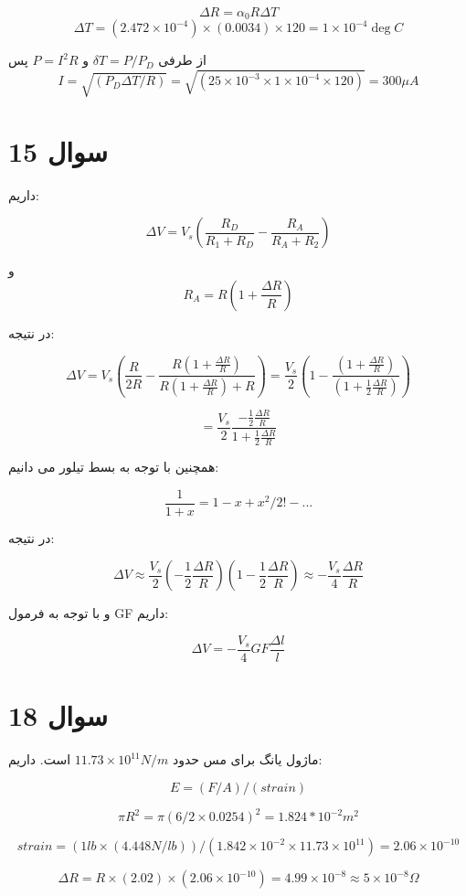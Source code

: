 \documentclass[12pt]{article}
\begin{document}
$$\Delta R = \alpha_0 R \Delta T$$
$$\Delta T = (2.472 \times 10^{-4}) \times (0.0034) \times 120 = 1 \times 10^{-4} \deg C$$

از طرفی 
$\delta T = P/P_D$
و
$P=I^2 R$
پس
$$I = \sqrt{(P_D \Delta T / R)} = \sqrt{(25 \times 10^{-3} \times 1 \times 10^{-4} \times 120)} = 300 \mu A$$


\newpage

\section*{سوال 15}

داریم:

$$\Delta V = V_s (\frac{R_D}{R_1 + R_D} - \frac{R_A}{R_A + R_2})$$

و
$$R_A = R(1 + \frac{\Delta R}{ R})$$

در نتیجه:

$$\Delta V = V_s (\frac{R}{2R } - \frac{R(1 + \frac{\Delta R}{ R})}{R(1 + \frac{\Delta R}{ R}) + R}) = \frac{V_s}{2}(1 - \frac{(1 + \frac{\Delta R}{ R})}{(1 +\frac{1}{2} \frac{\Delta R}{ R})})$$

$$= \frac{V_s}{2} \frac{-\frac{1}{2} \frac{\Delta R}{R}}{1 + \frac{1}{2} \frac{\Delta R}{R}}$$

همچنین با توجه به بسط تیلور می دانیم:

$$\frac{1}{1+x} = 1 -x + x^2/2! - ...$$

در نتیجه:

$$\Delta V \approx \frac{V_s}{2} (-\frac{1}{2} \frac{\Delta R}{R}) (1 - \frac{1}{2} \frac{\Delta R}{R}) \approx -\frac{V_s}{4} \frac{\Delta R}{R}$$

و با توجه به فرمول GF داریم:

$$\Delta V = -\frac{V_s}{4} GF \frac{\Delta l}{l}$$

\newpage

\section*{سوال 18}

ماژول یانگ برای مس حدود 
$11.73 \times 10^{11} N/m$
است. داریم:

$$E=(F/A) / (strain)$$

$$\pi R^2 = \pi(6/2 \times 0.0254)^2 = 1.824*10^{-2} m^2$$

$$strain = (1 lb \times (4.448 N/lb)) / (1.842 \times 10^{-2} \times 11.73 \times 10^{11}) = 2.06 \times 10^{-10}$$

$$\Delta R = R \times (2.02) \times (2.06 \times 10^{-10}) = 4.99 \times 10^{-8} \approx 5 \times 10^{-8} \Omega$$
\end{document}

